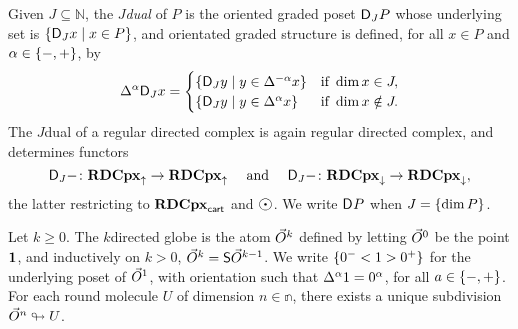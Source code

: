 Given \( J \subseteq \mathbb{N} \), the \emph{\( J \)\nbd dual} of \( P \) is the oriented graded poset \( \mathsf{D}_{J}{P} \) whose underlying set is \( \left\{ {\mathsf{D}_{J}{x} \mid x \in P} \right\} \), and orientated graded structure is defined, for all \( x \in P \) and \( \alpha \in \left\{ {-, +} \right\} \), by
\begin{equation*}
    \Delta_{}^{\alpha} \mathsf{D}_{J}{x} = 
    \begin{cases}
        \left\{ {\mathsf{D}_{J}{y} \mid y \in \Delta_{}^{-\alpha} x} \right\} & \text{if } \dim x \in J,\\
        \left\{ {\mathsf{D}_{J}{y} \mid y \in \Delta_{}^{\alpha} x} \right\}  & \text{if } \dim x \notin J.
    \end{cases}
\end{equation*}
The \( J \)\nbd dual of a regular directed complex is again regular directed complex, and determines functors 
\begin{equation*}
    \mathsf{D}_{J}{-} \colon \mathbf{RDCpx}_{\uparrow} \to \mathbf{RDCpx}_{\uparrow} \quad\text{ and }\quad \mathsf{D}_{J}{-} \colon \mathbf{RDCpx}_{\downarrow} \to \mathbf{RDCpx}_{\downarrow},
\end{equation*}
the latter restricting to \( \mathbf{RDCpx}_{\mathsf{cart}} \) and \( \atom \).
We write \( \mathsf{D}_{}{P} \) when \( J = \left\{ {\dim P} \right\} \).

Let \( k \geq 0 \).
The \( k \)\nbd directed globe is the atom \( \vec{O}^{k} \) defined by letting \( \vec{O}^{0} \) be the point \( \mathbf{1} \), and inductively on \( k > 0 \), \( \vec{O}^{k} = \mathsf{S}{\vec{O}^{k - 1}} \).
We write \( \left\{ {0^- < 1 > 0^+} \right\} \) for the underlying poset of \( \vec{O}^{1} \), with orientation such that \( \Delta_{}^{\alpha} 1 = 0^\alpha \), for all \( a \in \left\{ {-, +} \right\} \).
For each round molecule \( U \) of dimension \( n \in \mathbb{n} \), there exists a unique subdivision \( \vec{O}^{n} \looparrowright U \).

